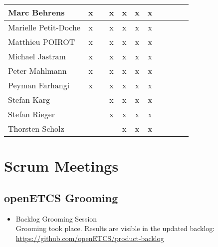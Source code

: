 \documentclass[a4paper, 11pt]{article}
\begin{document}
\begin{tabular}{|l|c|c|c|c||c|c|c||c|c|c|}
Marc Behrens         & x &   & x & x & x & x &  \\\hline
Marielle Petit-Doche & x  &   & x & x & x & x &  \\\hline
Matthieu POIROT       & x  &   & x  & x & x & x &   \\\hline
Michael Jastram      & x &   & x & x & x & x &   \\\hline
Peter Mahlmann       & x &   & x & x & x & x &  \\\hline
Peyman Farhangi      & x  &   & x & x & x & x &   \\\hline
Stefan Karg          &   &   & x  & x & x & x &  \\\hline
Stefan Rieger        &   &  & x & x & x & x &  \\\hline
Thorsten Scholz      &   &   &  & x & x & x &  \\\hline
\end{tabular}


\section{Scrum Meetings}

\subsection{openETCS Grooming}
\begin{itemize}
\item Backlog Grooming Session\\
Grooming took place. Results are visible in the updated backlog:\\
\url{https://github.com/openETCS/product-backlog}

\end{itemize}
\end{document}
